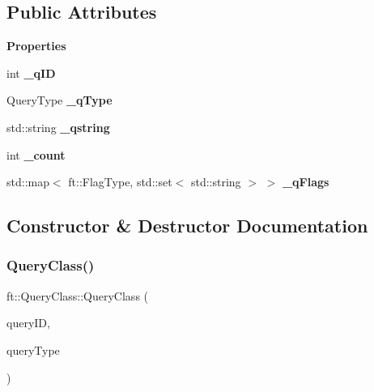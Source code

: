 \subsection*{Public Attributes}
\begin{Indent}\textbf{ Properties}\par
{\em }\begin{DoxyCompactItemize}
\item 
\mbox{\label{classft_1_1QueryClass_a716850d5f5342efa29db377664d91fa5}} 
int {\bfseries \+\_\+q\+ID}
\item 
\mbox{\label{classft_1_1QueryClass_a2e09bd62c3ce3e912324686574bbc539}} 
Query\+Type {\bfseries \+\_\+q\+Type}
\item 
\mbox{\label{classft_1_1QueryClass_aa98d9c482be47f13efa0ef8e9c420f49}} 
std\+::string {\bfseries \+\_\+qstring}
\item 
\mbox{\label{classft_1_1QueryClass_aecd6980f48c087fcc90751918400b8ef}} 
int {\bfseries \+\_\+count}
\item 
\mbox{\label{classft_1_1QueryClass_adfaa73588cd843c25b2d6c29a9cc3715}} 
std\+::map$<$ ft\+::\+Flag\+Type, std\+::set$<$ std\+::string $>$ $>$ {\bfseries \+\_\+q\+Flags}
\end{DoxyCompactItemize}
\end{Indent}


\subsection{Constructor \& Destructor Documentation}
\mbox{\label{classft_1_1QueryClass_acb92ce2a1c98cdc3d54ef12276b953a1}} 
\subsubsection{\texorpdfstring{Query\+Class()}{QueryClass()}\hspace{0.1cm}{\footnotesize\ttfamily [1/2]}}
{\footnotesize\ttfamily ft\+::\+Query\+Class\+::\+Query\+Class (\begin{DoxyParamCaption}\item[{int}]{query\+ID,  }\item[{ft\+::\+Query\+Type}]{query\+Type }\end{DoxyParamCaption})}

